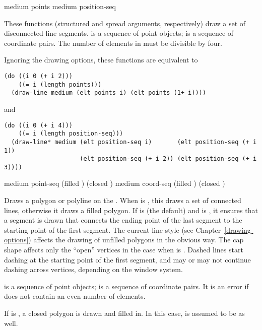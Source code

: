   {medium points \key \DrawingOptions \LineCapOptions}
 {medium position-seq \key \DrawingOptions \LineCapOptions}

These functions (structured and spread arguments, respectively) draw a set of
disconnected line segments.   is a sequence of point objects;
 is a sequence of coordinate pairs.  The number of elements in
 must be divisible by four.

Ignoring the drawing options, these functions are equivalent to
\begin{verbatim}
(do ((i 0 (+ i 2)))
    ((= i (length points)))
  (draw-line medium (elt points i) (elt points (1+ i))))
\end{verbatim}
and
\begin{verbatim}
(do ((i 0 (+ i 4)))
    ((= i (length position-seq)))
  (draw-line* medium (elt position-seq i)       (elt position-seq (+ i 1))
                     (elt position-seq (+ i 2)) (elt position-seq (+ i 3))))
\end{verbatim}


  {medium point-seq \key (filled ) (closed )
                        \DrawingOptions  \LineJointCapOptions}
 {medium coord-seq \key (filled ) (closed ) 
                        \DrawingOptions \LineJointCapOptions}

Draws a polygon or polyline on the  .  When
 is , this draws a set of connected lines, otherwise it
draws a filled polygon.  If  is  (the default) and
 is , it ensures that a segment is drawn that connects
the ending point of the last segment to the starting point of the first segment.
The current line style (see Chapter~\ref{drawing-options}) affects the drawing
of unfilled polygons in the obvious way.  The cap shape affects only the
``open'' vertices in the case when  is .  Dashed lines
start dashing at the starting point of the first segment, and may or may not
continue dashing across vertices, depending on the window system.

 is a sequence of point objects;  is a sequence of
coordinate pairs.  It is an error if  does not contain an even
number of elements.

If  is , a closed polygon is drawn and filled in.  In
this case,  is assumed to be  as well.


